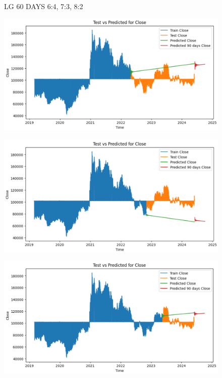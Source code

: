 \documentclass{article}
\begin{document}
\begin{multicols}{2}
\begin{figure}[H]
\begin{minipage}{0.15\textwidth}
    \label{fig:3}
    \end{minipage}
    \caption{LG 60 DAYS  6:4, 7:3, 8:2 }
\end{figure}

\begin{figure}[H]
    \centering
    \begin{minipage}{0.15\textwidth}
    \centering
    \includegraphics[width=1\textwidth]{Image/VARMA/LG/6_4/90.png}
   
    \label{fig:1}
    \end{minipage}%
    \begin{minipage}{0.15\textwidth}
    \centering
    \includegraphics[width=1\textwidth]{Image/VARMA/LG/7_3/90.png}
  
    \label{fig:2}
    \end{minipage}%
    \begin{minipage}{0.15\textwidth}
    \centering
    \includegraphics[width=1\textwidth]{Image/VARMA/LG/8_2/90.png}


\end{minipage}
\end{figure}
\end{multicols}
\end{document}
